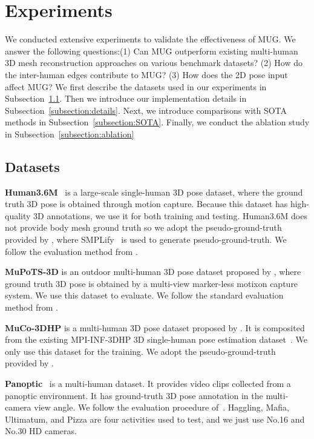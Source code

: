 \documentclass[runningheads]{llncs}
\begin{document}
\section{Experiments}
We conducted extensive experiments to validate the effectiveness of MUG. We answer the following questions:(1) Can MUG outperform existing multi-human 3D mesh reconstruction approaches on various benchmark datasets?
(2) How do the inter-human edges contribute to MUG?
(3) How does the 2D pose input affect MUG?
We first describe the datasets used in our experiments in Subsection~\ref{subsection:dataset}. Then we introduce our implementation details in Subsection~\ref{subsection:details}. Next, we introduce comparisons with SOTA methods in Subsection~\ref{subsection:SOTA}. Finally, we conduct the ablation study in Subsection~\ref{subsection:ablation}




\subsection{Datasets}\label{subsection:dataset}
\noindent\textbf{Human3.6M}~\cite{ionescu2013human3} is a large-scale single-human 3D pose dataset, where the ground truth 3D pose is obtained through motion capture. Because this dataset has high-quality 3D annotations, we use it for both training and testing. Human3.6M does not provide body mesh ground truth so we adopt the pseudo-ground-truth provided by \cite{moon2020i2l}, where SMPLify~\cite{pavlakos2019expressive} is used to generate pseudo-ground-truth. We follow the evaluation method from \cite{kanazawa2018end}.

\noindent\textbf{MuPoTS-3D} is an outdoor multi-human 3D pose dataset proposed by \cite{mehta2018single}, where ground truth 3D pose is obtained by a multi-view marker-less motixon capture system. We use this dataset to evaluate. We follow the standard evaluation method from \cite{jiang2020coherent}.

\noindent\textbf{MuCo-3DHP} is a multi-human 3D pose dataset proposed by \cite{mehta2018single}. It is composited from the existing MPI-INF-3DHP 3D single-human pose estimation dataset~\cite{mehta2017monocular}. We only use this dataset for the training. We adopt the pseudo-ground-truth provided by \cite{choi2020pose2mesh}.

\noindent\textbf{Panoptic}~\cite{joo2015panoptic} is a multi-human dataset. It provides video clips collected from a panoptic environment. It has ground-truth 3D pose annotation in the multi-camera view angle. We follow the evaluation procedure of~\cite{zanfir2018monocular}. Haggling, Mafia, Ultimatum, and Pizza are four activities used to test, and we just use No.16 and No.30 HD cameras.
\end{document}
